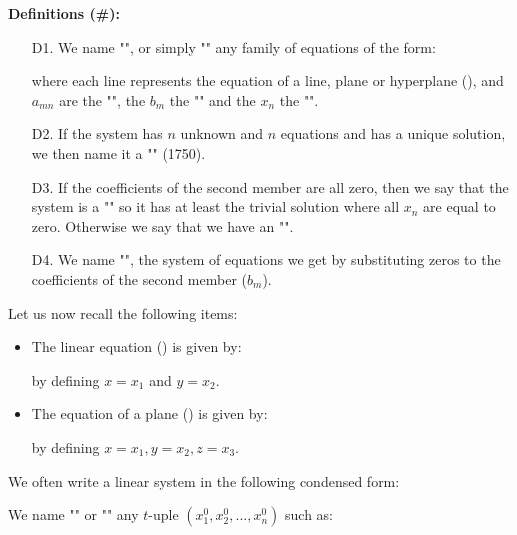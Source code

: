 \textbf{Definitions (\#\mydef):}
\begin{enumerate}
	\item[D1.] We name "", or simply "" any family of equations of the form:
	
where each line represents the equation of a line, plane or hyperplane (), and $a_{mn}$ are the "", the $b_m$ the "" and the $x_n$ the "".

	\item[D2.] If the system has $n$ unknown and $n$ equations and has a unique solution, we then name it a "" (1750).\label{unique solution linear system}
	
	\item[D3.] If the coefficients of the second member are all zero, then we say that the system is a "" so it has at least the trivial solution where all $x_n$ are equal to zero. Otherwise we say that we have an "".
	
	\item[D4.] We name "", the system of equations we get by substituting zeros to the coefficients of the second member ($b_m$).
	\end{enumerate}
Let us now recall the following items:
	\begin{itemize}
		\item The linear equation () is given by:
			
		by defining $x=x_1$ and $y=x_2$.
		
		\item The equation of a plane () is given by:
			
		by defining $x=x_1, y=x_2, z=x_3$.
	\end{itemize}
We often write a linear system in the following condensed form:
	
We name "" or "" any $t$-uple $(x_1^0,x_2^0,...,x_n^0)$ such as:
	

